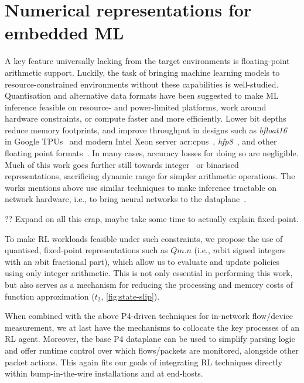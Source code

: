\section{Numerical representations for embedded ML}\label{sec:numerical-representations-for-embedded-ml}
A key feature universally lacking from the target environments is floating-point arithmetic support.
Luckily, the task of bringing machine learning models to resource-constrained environments without these capabilities is well-studied.
Quantisation and alternative data formats have been suggested to make ML inference feasible on resource- and power-limited platforms, work around hardware constraints, or compute faster and more efficiently.
Lower bit depths reduce memory footprints, and improve throughput in designs such as \emph{bfloat16}~\parencite{bfloat16-blog} in Google TPUs~\parencite{DBLP:journals/sigops/XieDMKVZT18} and modern Intel Xeon server \glspl{acr:cpu}~\parencite{intel-bfloat}, \emph{hfp8}~\parencite{DBLP:conf/nips/SunCCWVSCZG19}, and other floating point formats~\parencite{DBLP:journals/corr/abs-2007-01530}.
In many cases, accuracy losses for doing so are negligible.
Much of this work goes further still towards integer~\parencite{tensorrt-8bit} or binarised~\parencite{DBLP:journals/corr/MiyashitaLM16,DBLP:conf/eccv/RastegariORF16,DBLP:journals/corr/KimS16,DBLP:conf/nips/HubaraCSEB16} representations, sacrificing dynamic range for simpler arithmetic operations.
The works mentions above use similar techniques to make inference tractable on network hardware, i.e., to bring neural networks to the dataplane~\parencite{DBLP:journals/corr/abs-2009-02353,DBLP:conf/sigcomm/SanvitoSB18,DBLP:journals/corr/abs-1801-05731}.

?? Expand on all this crap, maybe take some time to actually explain fixed-point.

To make RL workloads feasible under such constraints, we propose the use of quantised, fixed-point representations such as $Qm.n$ (i.e., $m$\si{bit} signed integers with an $n$\si{bit} fractional part), which allow us to evaluate and update policies using only integer arithmetic.
This is not only essential in performing this work, but also serves as a mechanism for reducing the processing and memory costs of function approximation ($t_2$, \cref{fig:state-slip}).

When combined with the above P4-driven techniques for in-network flow/device measurement, we at last have the mechanisms to collocate the key processes of an RL agent.
Moreover, the base P4 dataplane can be used to simplify parsing logic and offer runtime control over which flows/packets are monitored, alongside other packet actions.
This again fits our goals of integrating RL techniques directly within bump-in-the-wire installations and at end-hosts.

